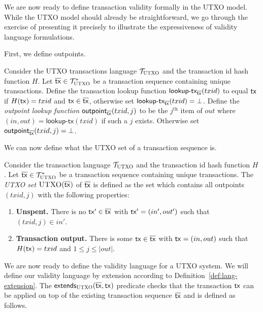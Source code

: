 We are now ready to define transaction validity formally in the UTXO model.
While the UTXO model should already be straightforward, we go through the
exercise of presenting it precisely to illustrate the expressiveness of validity
language formulations.

First, we define outpoints.

\begin{definition}[Outpoint]
  Consider the UTXO transactions language $\mathcal{T}_{\textsc{UTXO}}$ and the transaction id
  hash function $H$.
  Let $\overline{\mathsf{tx}} \in \mathcal{T}_{\textsc{UTXO}}^*$ be a transaction sequence
  containing unique transactions.
  Define the transaction lookup function
  $\textsf{lookup-tx}_{\overline{\mathsf{tx}}}(txid)$ to equal $\mathsf{tx}$ if $H(\mathsf{tx}) = txid$ and
  $\mathsf{tx} \in \overline{\mathsf{tx}}$, otherwise set $\textsf{lookup-tx}_{\overline{\mathsf{tx}}}(txid) = \bot$.
  Define the \emph{outpoint lookup function}
  $\textsf{outpoint}_{\overline{\mathsf{tx}}}(txid, j)$ to be the $j^\text{th}$ item of $out$ where
  $(in, out) = \textsf{lookup-tx}(txid)$ if such a $j$ exists. Otherwise
  set $\textsf{outpoint}_{\overline{\mathsf{tx}}}(txid, j) = \bot$.
\end{definition}

We can now define what the UTXO set of a transaction sequence is.

\begin{definition}
  Consider the transaction language $\mathcal{T}_{\textsc{UTXO}}$ and the transaction
  id hash function $H$. Let
  $\overline{\mathsf{tx}} \in \mathcal{T}_{\textsc{UTXO}}^*$ be a transaction sequence containing
  unique transactions.
  The \emph{UTXO set} $\textsc{UTXO}(\overline{\mathsf{tx}})$ of $\overline{\mathsf{tx}}$ is defined as
  the set which contains all outpoints $(txid, j)$ with the following properties:

  \begin{enumerate}
    \item \textbf{Unspent.}
          There is no $\mathsf{tx}' \in \overline{\mathsf{tx}}$ with $\mathsf{tx}' = (in', out')$ such that
          $(txid, j) \in in'$.
    \item \textbf{Transaction output.}
          There is some $\mathsf{tx} \in \overline{\mathsf{tx}}$ with $\mathsf{tx} = (in, out)$
          such that $H(\mathsf{tx}) = txid$ and $1 \leq j \leq |out|$.
  \end{enumerate}
\end{definition}

We are now ready to define the validity language for a UTXO system. We will
define our validity language by extension according to
Definition~\ref{def:lang-extension}.
The $\textsf{extends}_{\textsc{UTXO}}(\overline{\mathsf{tx}}, \mathsf{tx})$ predicate checks that
the transaction $\mathsf{tx}$ can be applied on top of the existing transaction sequence
$\overline{\mathsf{tx}}$ and is defined as follows.

